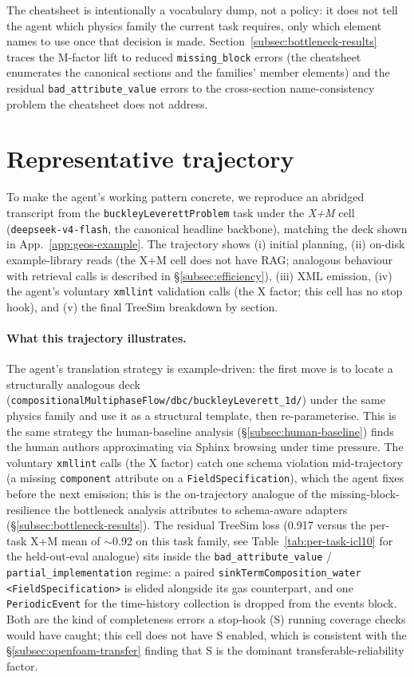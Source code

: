 \documentclass{article}
\newcommand{\promptinput}[2][]{%
  \VerbatimInput[
    fontsize=\footnotesize,
    breaklines=true,
    breakanywhere=true,
    breaksymbolright=\small$\hookrightarrow$,
    obeytabs=true,
    tabsize=2,
    frame=leftline,
    framerule=0.6pt,
    rulecolor=\color{gray},
    #1
  ]{#2}%
}
\begin{document}
The cheatsheet is intentionally a vocabulary dump, not a policy: it does not tell the agent which physics family the current task requires, only which element names to use once that decision is made. Section~\ref{subsec:bottleneck-results} traces the M-factor lift to reduced \texttt{missing\_block} errors (the cheatsheet enumerates the canonical sections and the families' member elements) and the residual \texttt{bad\_attribute\_value} errors to the cross-section name-consistency problem the cheatsheet does not address.


\section{Representative trajectory}
\label{app:case-study}

To make the agent's working pattern concrete, we reproduce an abridged transcript from the \texttt{buckleyLeverettProblem} task under the \emph{X+M} cell (\texttt{deepseek-v4-flash}, the canonical headline backbone), matching the deck shown in App.~\ref{app:geos-example}. The trajectory shows (i) initial planning, (ii) on-disk example-library reads (the X+M cell does not have RAG; analogous behaviour with retrieval calls is described in \S\ref{subsec:efficiency}), (iii) XML emission, (iv) the agent's voluntary \texttt{xmllint} validation calls (the X factor; this cell has no stop hook), and (v) the final TreeSim breakdown by section.

\promptinput{assets/trajectory_buckleyleverett_xm.txt}

\paragraph{What this trajectory illustrates.} The agent's translation strategy is example-driven: the first move is to locate a structurally analogous deck (\texttt{compositionalMultiphaseFlow/dbc/buckleyLeverett\_1d/}) under the same physics family and use it as a structural template, then re-parameterise. This is the same strategy the human-baseline analysis (\S\ref{subsec:human-baseline}) finds the human authors approximating via Sphinx browsing under time pressure. The voluntary \texttt{xmllint} calls (the X factor) catch one schema violation mid-trajectory (a missing \texttt{component} attribute on a \texttt{FieldSpecification}), which the agent fixes before the next emission; this is the on-trajectory analogue of the missing-block-resilience the bottleneck analysis attributes to schema-aware adapters (\S\ref{subsec:bottleneck-results}). The residual TreeSim loss (0.917 versus the per-task X+M mean of $\sim$0.92 on this task family, see Table~\ref{tab:per-task-icl10} for the held-out-eval analogue) sits inside the \texttt{bad\_attribute\_value} / \texttt{partial\_implementation} regime: a paired \texttt{sinkTermComposition\_water} \texttt{<FieldSpecification>} is elided alongside its gas counterpart, and one \texttt{PeriodicEvent} for the time-history collection is dropped from the events block. Both are the kind of completeness errors a stop-hook (S) running coverage checks would have caught; this cell does not have S enabled, which is consistent with the \S\ref{subsec:openfoam-transfer} finding that S is the dominant transferable-reliability factor.



\newpage

\end{document}
